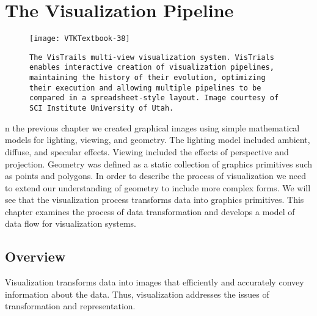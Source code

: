 \chapter{The Visualization Pipeline}
\label{chap:visualization_pipeline}

\begin{figure}[ht]
	\hfill
	\begin{minipage}{0.5\textwidth}
		\centering
		\texttt{[image: VTKTextbook-38]}\\
		\caption*{\texttt{The VisTrails multi-view visualization system.
				VisTrials enables interactive creation of visualization pipelines, maintaining the history of their evolution, optimizing their execution and allowing multiple pipelines to be compared in a spreadsheet-style layout.
				Image courtesy of SCI Institute University of Utah.}}
	\end{minipage}
\end{figure}

n the previous chapter we created graphical images using simple mathematical models for lighting, viewing, and geometry.
The lighting model included ambient, diffuse, and specular effects.
Viewing included the effects of perspective and projection.
Geometry was defined as a static collection of graphics primitives such as points and polygons.
In order to describe the process of visualization we need to extend our understanding of geometry to include more complex forms.
We will see that the visualization process transforms data into graphics primitives.
This chapter examines the process of data transformation and develops a model of data flow for visualization systems.

\section {Overview}
Visualization transforms data into images that efficiently and accurately convey information about
the data. Thus, visualization addresses the issues of transformation and representation.
